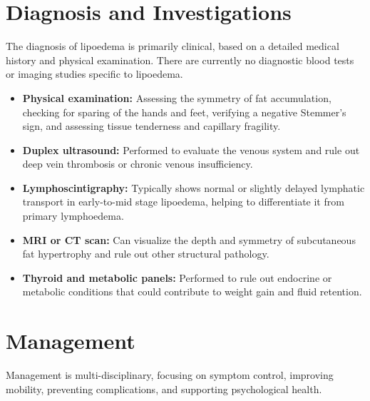\section*{Diagnosis and Investigations}
The diagnosis of lipoedema is primarily clinical, based on a detailed medical history and physical examination. There are currently no diagnostic blood tests or imaging studies specific to lipoedema.

\begin{itemize}
    \item \textbf{Physical examination:} Assessing the symmetry of fat accumulation, checking for sparing of the hands and feet, verifying a negative Stemmer's sign, and assessing tissue tenderness and capillary fragility.
    \item \textbf{Duplex ultrasound:} Performed to evaluate the venous system and rule out deep vein thrombosis or chronic venous insufficiency.
    \item \textbf{Lymphoscintigraphy:} Typically shows normal or slightly delayed lymphatic transport in early-to-mid stage lipoedema, helping to differentiate it from primary lymphoedema.
    \item \textbf{MRI or CT scan:} Can visualize the depth and symmetry of subcutaneous fat hypertrophy and rule out other structural pathology.
    \item \textbf{Thyroid and metabolic panels:} Performed to rule out endocrine or metabolic conditions that could contribute to weight gain and fluid retention.
\end{itemize}

\section*{Management}
Management is multi-disciplinary, focusing on symptom control, improving mobility, preventing complications, and supporting psychological health.

